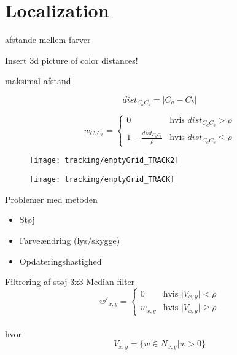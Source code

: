 \section{Localization}

\begin{frame}{afstande mellem farver}

Insert 3d picture of color distances!

\end{frame}

\begin{frame}{maksimal afstand}

$$dist_{C_aC_b} = \vert C_a - C_b \vert$$

$$w_{C_aC_b} = \begin{cases}
	0 &\text{hvis } dist_{C_aC_b} > \rho \\
	1 - \frac{dist_{C_aC_b}}{\rho} &\text{hvis } dist_{C_aC_b} \leq \rho
\end{cases}$$

\end{frame}

\begin{frame}

\begin{figure}
\centering
\texttt{[image: tracking/emptyGrid\_TRACK2]}

\texttt{[image: tracking/emptyGrid\_TRACK]}

\end{figure}
\end{frame}

\begin{frame}{Problemer med metoden}
\begin{itemize}
\item Støj
\item Farveændring (lys/skygge)
\item Opdateringshastighed
\end{itemize}

\end{frame}



\begin{frame}{Filtrering af støj}
3x3 Median filter \\


$$w'_{x,y} = \begin{cases}
	0 &\text{hvis } \vert V_{x,y} \vert < \rho \\
	w_{x,y} &\text{hvis } \vert V_{x,y} \vert \geq \rho
\end{cases}$$ \\
hvor $$V_{x,y} = \{w \in N_{x,y} \vert w > 0 \}$$
\end{frame}

